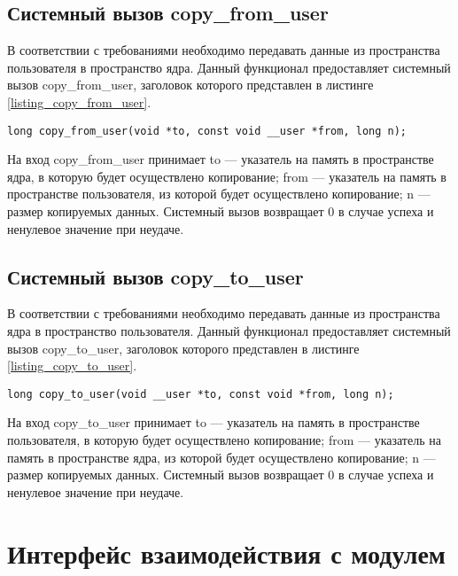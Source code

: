 \subsection{Системный вызов copy\_from\_user}

В соответствии с требованиями необходимо передавать данные из пространства пользователя в пространство ядра.
Данный функционал предоставляет системный вызов copy\_from\_user, заголовок которого представлен в листинге \ref{listing_copy_from_user}.
\begin{center}
	\begin{lstlisting}[label=listing_copy_from_user,caption=Заголовок системного вызова copy\_from\_user]
long copy_from_user(void *to, const void __user *from, long n);
	\end{lstlisting}
\end{center}
На вход copy\_from\_user принимает to --- указатель на память в пространстве ядра, в которую будет осуществлено копирование; from --- указатель на память в пространстве пользователя, из которой будет осуществлено копирование; n --- размер копируемых данных.
Системный вызов возвращает 0 в случае успеха и ненулевое значение при неудаче.

\subsection{Системный вызов copy\_to\_user}

В соответствии с требованиями необходимо передавать данные из пространства ядра в пространство пользователя.
Данный функционал предоставляет системный вызов copy\_to\_user, заголовок которого представлен в листинге \ref{listing_copy_to_user}.
\begin{center}
	\begin{lstlisting}[label=listing_copy_to_user,caption=Заголовок системного вызова copy\_to\_user]
		long copy_to_user(void __user *to, const void *from, long n);
	\end{lstlisting}
\end{center}
На вход copy\_to\_user принимает to --- указатель на память в пространстве пользователя, в которую будет осуществлено копирование; from --- указатель на память в пространстве ядра, из которой будет осуществлено копирование; n --- размер копируемых данных.
Системный вызов возвращает 0 в случае успеха и ненулевое значение при неудаче.

\section{Интерфейс взаимодействия с модулем}


